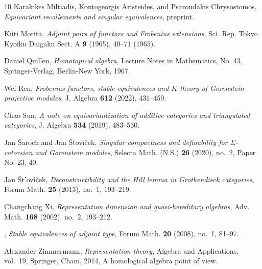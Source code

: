 \documentclass[12pt,twoside]{amsart}
\theoremstyle{bfupright head,slanted body}
\theoremstyle{bfupright head,upright body}
\theoremstyle{fixed bf head,slanted body}
\theoremstyle{fixed bf head,upright body}
\theoremstyle{numbered paragraph}
\numberwithin{equation}{res}
\begin{document}
\begin{thebibliography}{10}
Karakikes Miltiadis, Kontogeorgis Aristeides, and Psaroudakis Chrysostomos,
  \emph{Equivariant recollements and singular equivalences}, preprint.

Kiiti Morita, \emph{Adjoint pairs of functors and {F}robenius extensions}, Sci.
  Rep. Tokyo Kyoiku Daigaku Sect. A \textbf{9} (1965), 40--71 (1965).

Daniel Quillen, \emph{Homotopical algebra}, Lecture Notes in Mathematics, No.
  43, Springer-Verlag, Berlin-New York, 1967. 


Wei Ren, \emph{Frobenius functors, stable equivalences and {$K$}-theory of
  {G}orenstein projective modules}, J. Algebra \textbf{612} (2022), 431--459.

Chao Sun, \emph{A note on equivariantization of additive categories and
  triangulated categories}, J. Algebra \textbf{534} (2019), 483--530.

Jan \v{S}aroch and Jan \v{S}\v{t}ov\'{\i}\v{c}ek, \emph{Singular compactness
  and definability for {$\Sigma$}-cotorsion and {G}orenstein modules}, Selecta
  Math. (N.S.) \textbf{26} (2020), no.~2, Paper No. 23, 40. 

Jan \v{S}t'ov\'{\i}\v{c}ek, \emph{Deconstructibility and the {H}ill lemma in
  {G}rothendieck categories}, Forum Math. \textbf{25} (2013), no.~1, 193--219.

Changchang Xi, \emph{Representation dimension and quasi-hereditary algebras},
  Adv. Math. \textbf{168} (2002), no.~2, 193--212. 

\bysame, \emph{Stable equivalences of adjoint type}, Forum Math. \textbf{20}
  (2008), no.~1, 81--97. 

Alexander Zimmermann, \emph{Representation theory}, Algebra and Applications,
  vol.~19, Springer, Cham, 2014, A homological algebra point of view.

\end{thebibliography}
\end{document}
